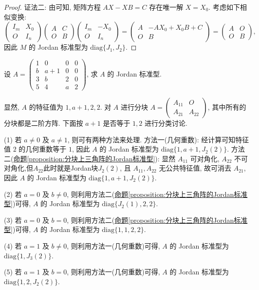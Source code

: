 \documentclass[../../main.tex]{subfiles}
\begin{document}
\begin{proof}
{\color{blue}证法二:}
由可知, 矩阵方程 $AX - XB = C$ 存在唯一解 $X = X_0$. 考虑如下相似变换:
\[
\begin{pmatrix}I_m & X_0 \\ O & I_n\end{pmatrix}
\begin{pmatrix}A & C \\ O & B\end{pmatrix}
\begin{pmatrix}I_m & -X_0 \\ O & I_n\end{pmatrix}
=
\begin{pmatrix}A & -AX_0 + X_0B + C \\ O & B\end{pmatrix}
=
\begin{pmatrix}A & O \\ O & B\end{pmatrix},
\]
因此 $M$ 的 Jordan 标准型为 $\mathrm{diag}\{J_1,J_2\}$. 
\end{proof}

\begin{example}
设 $A = \begin{pmatrix}
1 & 0 & 0 & 0 \\
b & a + 1 & 0 & 0 \\
3 & b & 2 & 0 \\
5 & 4 & a & 2
\end{pmatrix}$, 求 $A$ 的 Jordan 标准型.
\end{example}
\begin{solution}
显然, $A$ 的特征值为 $1,a + 1,2,2$. 对 $A$ 进行分块 $A = \begin{pmatrix}A_{11} & O \\ A_{21} & A_{22}\end{pmatrix}$, 其中所有的分块都是二阶方阵. 下面按 $a + 1$ 是否等于 $1,2$ 进行分类讨论.

(1) 若 $a \neq 0$ 及 $a \neq 1$, 则可有两种方法来处理. {\heiti 方法一}(几何重数): 经计算可知特征值 $2$ 的几何重数等于 $1$, 因此 $A$ 的 Jordan 标准型为 $\mathrm{diag}\{1,a + 1,J_2(2)\}$. {\heiti 方法二}(\hyperref[proposition:分块上三角阵的Jordan标准型]{命题\ref{proposition:分块上三角阵的Jordan标准型}}): 显然 $A_{11}$ 可对角化, $A_{22}$ 不可对角化,但$A_{22}$此时就是Jordan块$J_2(2)$, 且 $A_{11},A_{22}$ 无公共特征值, 故可消去 $A_{21}$, 因此 $A$ 的 Jordan 标准型为 $\mathrm{diag}\{1,a + 1,J_2(2)\}$.

(2) 若 $a = 0$ 及 $b \neq 0$, 则利用{\heiti 方法二}(\hyperref[proposition:分块上三角阵的Jordan标准型]{命题\ref{proposition:分块上三角阵的Jordan标准型}})可得, $A$ 的 Jordan 标准型为 $\mathrm{diag}\{J_2(1),2,2\}$.

(3) 若 $a = 0$ 及 $b = 0$, 则利用{\heiti 方法二}(\hyperref[proposition:分块上三角阵的Jordan标准型]{命题\ref{proposition:分块上三角阵的Jordan标准型}})可得, $A$ 的 Jordan 标准型为 $\mathrm{diag}\{1,1,2,2\}$.

(4) 若 $a = 1$ 及 $b \neq 0$, 则利用{\heiti 方法一}(几何重数)可得, $A$ 的 Jordan 标准型为 $\mathrm{diag}\{1,J_3(2)\}$.

(5) 若 $a = 1$ 及 $b = 0$, 则利用{\heiti 方法一}(几何重数)可得, $A$ 的 Jordan 标准型为 $\mathrm{diag}\{1,2,J_2(2)\}$. 
\end{solution}
\end{document}
